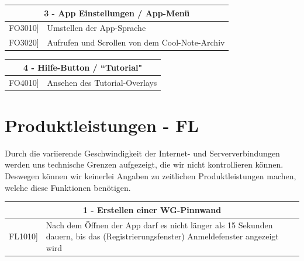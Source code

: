 \documentclass[a4paper]{scrreprt}
\begin{document}
    		\begin{table}[h!]
    			\centering
    			\label{my-label}
    			\begin{tabular}{p{2cm}p{12cm}}
    				
    				\multicolumn{2}{c}{\textbf{3 - App Einstellungen / App-Menü}} \\ \hline
    				\centering{[}FO3010{]} & Umstellen der App-Sprache\\
    				\centering{[}FO3020{]} & Aufrufen und Scrollen von dem Cool-Note-Archiv\\
    				\hline
    			\end{tabular}
    		\end{table}
    		
    		\vspace{5mm}
    		
    		\begin{table}[h!]
    			\centering
    			\label{my-label}
    			\begin{tabular}{p{2cm}p{12cm}}
    				
    				\multicolumn{2}{c}{\textbf{4 - Hilfe-Button / ``Tutorial"}} \\ \hline
    				\centering{[}FO4010{]} & Ansehen des Tutorial-Overlays\\    				
    				\hline
    			\end{tabular}
    		\end{table}
    		
    		\vspace{1cm}
    		
    		\newpage
    		
    		\section{Produktleistungen - FL}
    		Durch die variierende Geschwindigkeit der Internet- und Serververbindungen werden uns technische Grenzen aufgezeigt, die wir nicht kontrollieren können. Deswegen können wir keinerlei Angaben zu zeitlichen Produktleistungen machen, welche diese Funktionen benötigen. 
    		\\
    		
    		\begin{table}[h!]
    			\centering
    			\label{my-label}
    			\begin{tabular}{p{2cm}p{12cm}}
    				
    				\multicolumn{2}{c}{\textbf{1 - Erstellen einer WG-Pinnwand}} \\ \hline
    				\centering{[}FL1010{]} & Nach dem Öffnen der App darf es nicht länger als 15 Sekunden dauern, bis das (Registrierungsfenster) Anmeldefenster angezeigt wird \\
    				\hline
    			\end{tabular}
    		\end{table}
    		
\end{document}
